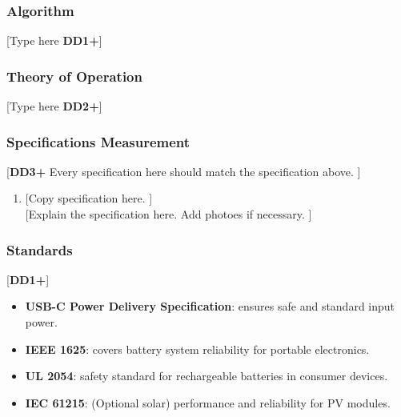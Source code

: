 \subsubsection{Algorithm}
[Type here \textbf{DD1+}]

\subsubsection{Theory of Operation}
[Type here \textbf{DD2+}]
\subsubsection{Specifications Measurement}
[\textbf{DD3+} Every specification here should match the specification above. ]
\begin{enumerate}
    \item {[Copy specification here. ]} \\
          {[Explain the specification here. Add photoes if necessary. ]}
\end{enumerate}

\subsubsection{Standards}
[\textbf{DD1+}]
\begin{itemize}
    \item \textbf{USB-C Power Delivery Specification}: ensures safe and standard input power.
    \item \textbf{IEEE 1625}: covers battery system reliability for portable electronics.
    \item \textbf{UL 2054}: safety standard for rechargeable batteries in consumer devices.
    \item \textbf{IEC 61215}: (Optional solar) performance and reliability for PV modules.
\end{itemize}
